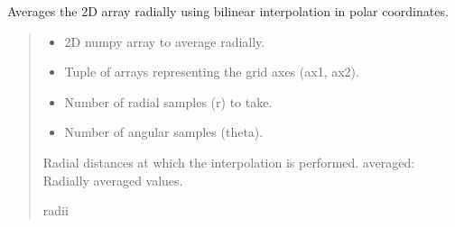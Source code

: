 \documentclass[letterpaper,10pt,english]{sphinxmanual}
\begin{document}
\begin{fulllineitems}
\label{\detokenize{source/stattools:stattools.average_rings2d}}
\pysigstartsignatures
\pysiglinewithargsret
{}
{\sphinxparamcomma {}\sphinxparamcomma {}\sphinxparamcomma {}}
{}
\pysigstopsignatures
\sphinxAtStartPar
Averages the 2D array radially using bilinear interpolation in polar coordinates.
\begin{quote}\begin{description}
\begin{itemize}
\item {} 
\sphinxAtStartPar
{} \textendash{} 2D numpy array to average radially.

\item {} 
\sphinxAtStartPar
{} \textendash{} Tuple of arrays representing the grid axes (ax1, ax2).

\item {} 
\sphinxAtStartPar
{} \textendash{} Number of radial samples (r) to take.

\item {} 
\sphinxAtStartPar
{} \textendash{} Number of angular samples (theta).

\end{itemize}

\sphinxAtStartPar
Radial distances at which the interpolation is performed.
averaged: Radially averaged values.

\sphinxAtStartPar
radii

\end{description}\end{quote}

\end{fulllineitems}
\end{document}
